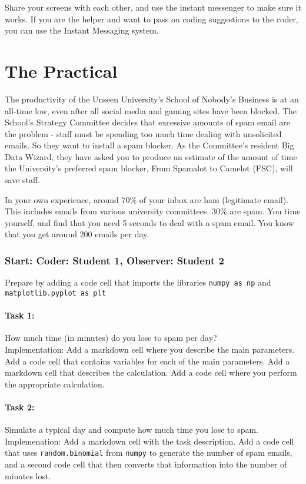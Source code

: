 \documentclass{article}
\begin{document}
Share your screens with each other, and use the instant messenger to make sure it works. If you are the helper and want to pass on coding suggestions to the coder, you can use the Instant Messaging system. 

\section{The Practical}

The productivity of the Unseen University's School of Nobody's Business is at an all-time low, even after all social media and gaming sites have been blocked. The School's Strategy Committee decides that excessive amounts of spam email are the problem - staff must be spending too much time dealing with unsolicited emails. So they want to install a spam blocker. As the Committee's resident Big Data Wizard, they have asked you to produce an estimate of the amount of time the University's preferred spam blocker, From Spamalot to Camelot (FSC), will save staff.

In your own experience, around 70\% of your inbox are ham (legitimate email). This includes emails from various university committees. 30\% are spam. You time yourself, and find that you need 5 seconds to deal with a spam email. You know that you get around 200 emails per day.

\subsubsection*{Start: Coder: Student 1, Observer: Student 2}

Prepare by adding a code cell that imports the libraries \texttt{numpy as np} and \texttt{matplotlib.pyplot as plt}

\paragraph{Task 1:} How much time (in minutes) do you lose to spam per day?\\
Implementation: Add a markdown cell where you describe the main parameters. Add a code cell that contains variables for each of the main parameters. Add a markdown cell that describes the calculation. Add a code cell where you perform the appropriate calculation. 

\paragraph{Task 2:} Simulate a typical day and compute how much time you lose to spam.\\
Implemenation: Add a markdown cell with the task description. Add a code cell that uses \texttt{random.binomial} from \texttt{numpy} to generate the number of spam emails, and a second code cell that then converts that information into the number of minutes lost.
\end{document}
